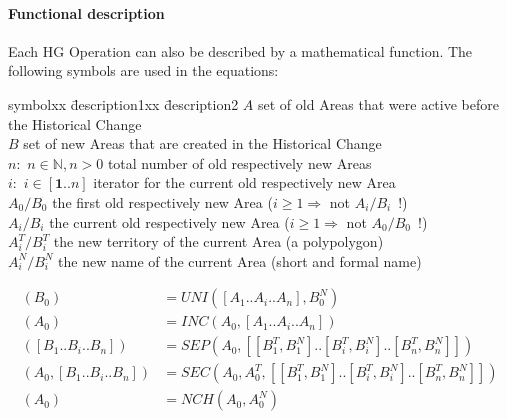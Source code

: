 \paragraph{Functional description} %
\label{par:functional_description}

Each HG Operation can also be described by a mathematical function. The following symbols are used in the equations:

\begin{addmargin}[1em]{0em}
\begin{tabbing}
  symbolxx \= description1xx \= description2 \kill
  $A$ \> set of old Areas that were active before the Historical Change \\
  $B$ \> set of new Areas that are created in the Historical Change \\
  $n:$ \> $n \in \mathbb{N}, n>0$ \> total number of old respectively new Areas \\
  $i:$ \> $i \in [\textbf{1} .. n]$ \> iterator for the current old respectively new Area \\
  $A_0/B_0$ \>    the first old respectively new Area ($i \geq 1 \Rightarrow$ not $A_i/B_i$~!) \\
  $A_i/B_i$ \>    the current old respectively new Area ($i \geq 1 \Rightarrow$ not $A_0/B_0$~!) \\
  $A_i^T/B_i^T$ \>the new territory of the current Area (a polypolygon) \\
  $A_i^N/B_i^N$ \>the new name of the current Area (short and formal name) \\
\end{tabbing}
\end{addmargin}

\begin{align*}
  (B_0)                       &= UNI([A_1 .. A_i .. A_n], B_0^N) \\
  (A_0)                       &= INC(A_0, [A_1 .. A_i .. A_n]) \\
  ([B_1 .. B_i .. B_n])       &= SEP(A_0, [[B_1^T, B_1^N] .. [B_i^T, B_i^N] .. [B_n^T, B_n^N]]) \\
  (A_0, [B_1 .. B_i .. B_n])  &= SEC(A_0, A_0^T, [[B_1^T, B_1^N] .. [B_i^T, B_i^N] .. [B_n^T, B_n^N]]) \\
  (A_0)                       &= NCH(A_0, A_0^N)
\end{align*}

